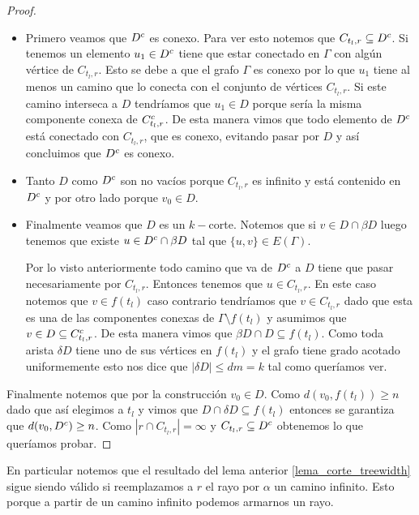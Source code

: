 \documentclass[tesis.tex]{subfiles}
\begin{document}
\begin{proof}
	\begin{itemize}
		\item 	
		Primero veamos que $D^{c}$ es conexo.
		Para ver esto notemos que $C_{t_{l},r} \subseteq D^{c}$. 
		Si tenemos un elemento $u_1 \in D^{c}$ tiene que estar conectado en $\Gamma$ con algún vértice de $C_{t_l, r}$.
		Esto se debe a que el grafo $\Gamma$ es conexo por lo que $u_{1}$ tiene al menos un camino que lo conecta con el conjunto de vértices $C_{t_{l},r}$.
		Si este camino interseca a $D$ tendríamos que $u_{1} \in D$ porque sería la misma componente conexa de $C_{t_l, r}^{c}$.
		De esta manera vimos que todo elemento de $D^{c}$ está conectado con  $C_{t_l, r}$, que es conexo, evitando pasar por $D$ y así concluimos que $D^{c}$ es conexo.
		\item 
		Tanto $D$ como $D^{c}$ son no vacíos porque $C_{t_l, r}$ es infinito y está contenido en $D^{c}$ y por otro lado porque $v_0 \in D$.
		\item
		Finalmente veamos que $D$ es un $k-$corte.
		Notemos que si $v \in D \cap \beta D$ luego tenemos que existe $u \in D^{c} \cap \beta D$ tal que $\{u,v\} \in E(\Gamma)$.
		
		Por lo visto anteriormente todo camino que va de $D^{c}$ a $D$ tiene que pasar necesariamente por $C_{t_l, r}$. 
		Entonces tenemos que $u \in C_{t_l, r}$.
		En este caso notemos que $v \in f{(t_l)}$ caso contrario tendríamos que $v \in C_{t_l, r}$ dado que esta es una de las componentes conexas de $\Gamma \setminus f{(t_l)}$ y asumimos que $v \in D \subseteq C_{t_{l},r}^{c}$.
		De esta manera vimos que $\beta D \cap D \subseteq f{(t_l)}$.
		Como toda arista $\delta D$ tiene uno de sus vértices en $f(t_{l})$ y el grafo tiene grado acotado uniformemente esto nos dice que $|\delta D| \le dm = k$ tal como queríamos ver. 
		
	\end{itemize}
	
Finalmente notemos que por la construcción $v_{0} \in D$.
Como $d(v_{0}, f(t_{l})) \ge n$ dado que así elegimos a $t_{l}$ 
y vimos que $D \cap \delta D \subseteq f(t_{l})$
entonces se garantiza que $d(v_{0}, D^{c}) \ge n$. 
Como $|r \cap C_{t_{l},r}| = \infty$ y $C_{t_{l},r} \subseteq D^{c}$ obtenemos lo que queríamos probar.
	
\end{proof}

\begin{obs}\label{obs_corte_tw}
	En particular notemos que el resultado del lema anterior \ref{lema_corte_treewidth} sigue siendo válido si reemplazamos a $r$ el rayo por $\alpha$ un camino infinito.
	Esto porque a partir de un camino infinito podemos armarnos un rayo.
\end{obs}
\end{document}
